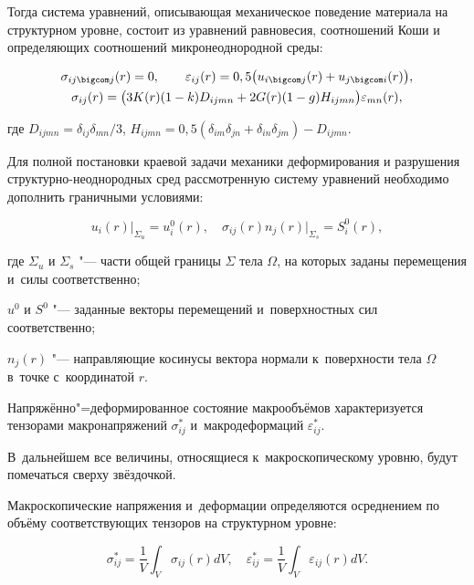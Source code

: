Тогда система уравнений, описывающая механическое поведение материала на структурном уровне, состоит из уравнений равновесия, соотношений Коши и определяющих соотношений микронеоднородной среды:

\begin{gather*}

  \sigma_{ij \bigcom j} (r) = 0, \qquad 

  \varepsilon_{ij} (r) = 0,5 \bigl(u_{i \bigcom j} (r) + u_{j\bigcom i} (r)\bigr), 

\\

  \sigma_{ij} (r) = \bigl( 3K (r) (1-k) D_{ijmn} + 2G (r) (1-g) H_{ijmn}  \bigr) \varepsilon_{mn} (r), 

\end{gather*}

где  $D_{ijmn} = \delta_{ij} \delta_{mn}/3$, $H_{ijmn} = 0,5( \delta_{im} \delta_{jn} + \delta_{in} \delta_{jm}) - D_{ijmn}$.





Для полной постановки краевой задачи механики деформирования и разрушения структурно-неоднородных сред рассмотренную систему уравнений необходимо дополнить граничными условиями:

$$

  u_i (r) \bigr|_{\Sigma_u}  =  u^0_i (r),  \quad \sigma_{ij} (r) n_j (r) \bigr|_{\Sigma_s} =   S^0_i (r),

$$

где $\Sigma_u$ и $\Sigma_s$ "--- части общей границы $\Sigma$ тела $\Omega$, на которых заданы перемещения и~силы соответственно; 

$u^0$ и $S^0$ "--- заданные векторы перемещений и~поверхностных сил соответственно; 

$n_j (r)$ "--- направляющие косинусы вектора нормали к~поверхности тела $\Omega $ в~точке с~координатой $r$.



Напряжённо"=деформированное состояние макрообъёмов характеризуется тензорами макронапряжений $\sigma^*_{ij}$ и~макродеформаций $\varepsilon^*_{ij}$. 

В~дальнейшем все величины, относящиеся к~макроскопическому уровню, будут помечаться сверху звёздочкой. 

Макроскопические напряжения и~деформации определяются осреднением по объёму соответствующих тензоров на структурном уровне:

\begin{equation*}

  \sigma^*_{ij} = \frac{1}{V} \int_V \sigma_{ij} (r) dV, \quad \varepsilon^*_{ij} = \frac{1}{V} \int_V \varepsilon_{ij} (r) dV.

\end{equation*}



